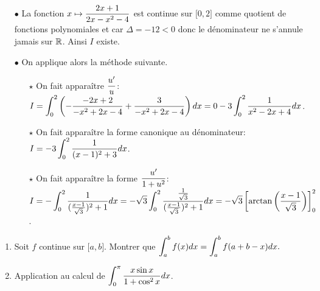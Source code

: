 \documentclass[a4paper, 11pt,reqno]{article}
\begin{document}
\begin{correction}
\begin{enumerate}
\begin{itemize}
			      \item[$\bullet$] La fonction $x\mapsto \displaystyle\frac{2x+1}{2x-x^2-4}$ est continue sur $\lbrack 0,2\rbrack$ comme quotient de fonctions polynomiales et car $\Delta=-12<0$ donc le d\'enominateur ne s'annule jamais sur $\mathbb{R}$. Ainsi $I$ existe.
			      \item[$\bullet$] On applique alors la m\'ethode suivante.
			            \begin{itemize}
				            \item[$\star$] On fait appara\^{i}tre $\displaystyle\frac{u^{\prime}}{u}$:\\
				                  \noindent $ \displaystyle I=\int_0^2 \left(-\displaystyle\frac{-2x+2}{-x^2+2x-4}+\displaystyle\frac{3}{-x^2+2x-4}\right)dx=0-3 \int_0^2 \displaystyle\frac{1}{x^2-2x+4}dx$.
				            \item[$\star$] On fait appara\^{i}tre la forme canonique au d\'enominateur:\\
				                  \noindent $ \displaystyle I=-3 \int_0^2 \displaystyle\frac{1}{(x-1)^2+3}dx$.
				            \item[$\star$] On fait appara\^{i}tre la forme $\displaystyle\frac{u^{\prime}}{1+u^2}$:\\
				                  \noindent $ \displaystyle I=-\int_0^2 \displaystyle\frac{1}{(\frac{x-1}{\sqrt{3}})^2+1}dx=-\sqrt{3}\int_0^2 \displaystyle\frac{\frac{1}{\sqrt{3}}}{(\frac{x-1}{\sqrt{3}})^2+1}dx=-\sqrt{3}\left\lbrack  \arctan{\left( \displaystyle\frac{x-1}{\sqrt{3}} \right)} \right\rbrack_0^2 $ .
			            \end{itemize}
		      \end{itemize}
	\end{enumerate}
\end{correction}
\begin{exercice}  \;
	\begin{enumerate}
		\item Soit $f$ continue sur $\lbrack a,b\rbrack$. Montrer que $\displaystyle \int_a^b f(x)dx=\int_a^b f(a+b-x)dx.$
		\item Application au calcul de $\displaystyle \int_0^\pi \displaystyle\frac{x\sin{x}}{1+\cos^2{x}} dx$.
	\end{enumerate}
\end{exercice}
\end{document}
